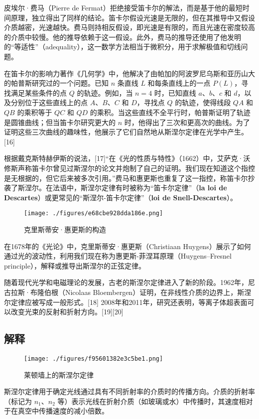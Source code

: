 皮埃尔·费马（Pierre de Fermat）拒绝接受笛卡尔的解法，而是基于他的最短时间原理，独立得出了同样的结论。笛卡尔假设光速是无限的，但在其推导中又假设介质越密，光速越快。费马则持相反假设，即光速是有限的，而且光速在密度较高的介质中较慢。他的推导依赖于这一假设。此外，费马的推导还使用了他发明的“等适性”（adequality），这一数学方法相当于微积分，用于求解极值和切线问题。

在笛卡尔的影响力著作《几何学》中，他解决了由帕加的阿波罗尼乌斯和亚历山大的帕普斯研究过的一个问题。已知 \( n \) 条直线 \( L \) 和每条直线上的一点 \( P(L) \)，寻找满足某些条件的点 \( Q \) 的轨迹。例如，当 \( n = 4 \) 时，已知直线 \( a \)、\( b \)、\( c \) 和 \( d \)，以及分别位于这些直线上的点 \( A \)、\( B \)、\( C \) 和 \( D \)，寻找点 \( Q \) 的轨迹，使得线段 \( QA \) 和 \( QB \) 的乘积等于 \( QC \) 和 \( QD \) 的乘积。当这些直线不全平行时，帕普斯证明了轨迹是圆锥曲线；但当笛卡尔研究更大的 \( n \) 时，他得出了三次和更高次的曲线。为了证明这些三次曲线的趣味性，他展示了它们自然地从斯涅尔定律在光学中产生。[16]

根据戴克斯特赫伊斯的说法，[17]“在《光的性质与特性》（1662）中，艾萨克·沃修斯声称笛卡尔曾见过斯涅尔的论文并炮制了自己的证明。我们现在知道这个指控是无根据的，但它后来被多次引用。”费马和惠更斯也重复了这一指控，称笛卡尔抄袭了斯涅尔。在法语中，斯涅尔定律有时被称为“笛卡尔定律”（\textbf{la loi de Descartes}）或更常见的“斯涅尔-笛卡尔定律”（\textbf{loi de Snell-Descartes}）。
\begin{figure}[ht]
\centering
\texttt{[image: ./figures/e68cbe928dda186e.png]}
\caption{克里斯蒂安·惠更斯的构造} \label{fig_SNR_4}
\end{figure}
在1678年的《光论》中，克里斯蒂安·惠更斯（Christiaan Huygens）展示了如何通过光的波动性，利用我们现在称为惠更斯-菲涅耳原理（Huygens–Fresnel principle），解释或推导出斯涅尔的正弦定律。

随着现代光学和电磁理论的发展，古老的斯涅尔定律进入了新的阶段。1962年，尼古拉斯·布隆伯根（Nicolaas Bloembergen）证明，在非线性介质的边界上，斯涅尔定律应被写成一般形式。[18] 2008年和2011年，研究还表明，等离子体超表面可以改变光束的反射和折射方向。[19][20]
\subsection{解释}
\begin{figure}[ht]
\centering
\texttt{[image: ./figures/f95601382e3c5be1.png]}
\caption{莱顿墙上的斯涅尔定律} \label{fig_SNR_5}
\end{figure}
斯涅尔定律用于确定光线通过具有不同折射率的介质时的传播方向。介质的折射率（标记为 \(n_1\)、\(n_2\) 等）表示光线在折射介质（如玻璃或水）中传播时，其速度相对于在真空中传播速度的减小倍数。

